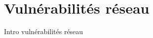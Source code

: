 

\chapter{Vulnérabilités réseau}\label{vulnerabilites:reseau}

Intro vulnérabilités réseau





\endinput
